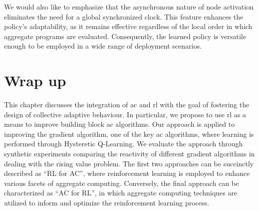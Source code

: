 We would also like to emphasize that the asynchronous nature of node activation eliminates the need for a global synchronized clock. 
 This feature enhances the policy's adaptability, as it remains effective regardless of the local order in which aggregate programs are evaluated. Consequently, the learned policy is versatile enough to be employed in a wide range of deployment scenarios.
\section{Wrap up}\label{coordination2022:s:conc}

This chapter discusses the integration of \acl{ac} and \acl{rl} with the goal of fostering the design of collective adaptive behaviour.
% 
In particular, we propose to use \ac{rl} as a means to improve building block \ac{ac} algorithms. %
%
Our approach is applied to improving the gradient algorithm, one of the key \ac{ac} algorithms, where learning is performed through Hysteretic Q-Learning.
%
We evaluate the approach through synthetic experiments comparing the reactivity of different gradient algorithms in dealing with the rising value problem.
%
The first two approaches can be succinctly described as ``RL for AC'', 
 where reinforcement learning is employed to enhance various facets of aggregate computing. 
 Conversely, the final approach can be characterized as ``AC for RL'', in which aggregate computing techniques are utilized to inform and optimize the reinforcement learning process.
